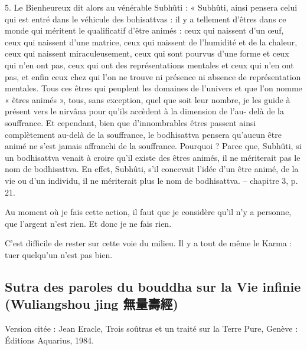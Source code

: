 \begin{singlequote}
    5.	Le Bienheureux dit alors au vénérable Subhûti :
« Subhûti, ainsi pensera celui qui est entré dans le véhicule des bohisattvas : il y a tellement d’êtres dans ce monde qui méritent le qualificatif d’être animés : ceux qui naissent d’un œuf, ceux qui naissent d’une matrice, ceux qui naissent de l’humidité et de la chaleur, ceux qui naissent miraculeusement, ceux qui sont pourvus d’une forme et ceux qui n’en ont pas, ceux qui ont des représentations mentales et ceux qui n’en ont pas, et enfin ceux chez qui l’on ne trouve ni présence ni absence de représentation mentales. Tous ces êtres qui peuplent les domaines de l’univers et que l’on nomme « êtres animés », tous, sans exception, quel que soit leur nombre, je les guide à présent vers le nirvâna pour qu’ils accèdent à la dimension de l’au- delà de la souffrance. Et cependant, bien que d’innombrables êtres passent ainsi complètement au-delà de la souffrance, le bodhisattva pensera qu’aucun être animé ne s’est jamais affranchi de la souffrance. Pourquoi ? Parce que, Subhûti, si un bodhisattva venait à croire qu’il existe des êtres animés, il ne mériterait pas le nom de bodhisattva. En effet, Subhûti, s’il concevait l’idée d’un être animé, de la vie ou d’un individu, il ne mériterait plus le nom de bodhisattva.
-- chapitre 3, p. 21.
\end{singlequote}

\begin{Ex}
    Au moment où je fais cette action, il faut que je considère qu'il n'y a personne, que l'argent n'est rien. Et donc je ne fais rien.
    
\end{Ex}
C'est difficile de rester sur cette voie du milieu. Il y a tout de même le Karma : tuer quelqu'un n'est pas bien. 
\subsection{Sutra des paroles du bouddha sur la Vie infinie (Wuliangshou jing 無量壽經)}

Version citée : Jean Eracle, Trois soûtras et un traité sur la Terre Pure, Genève : Éditions Aquarius, 1984.

